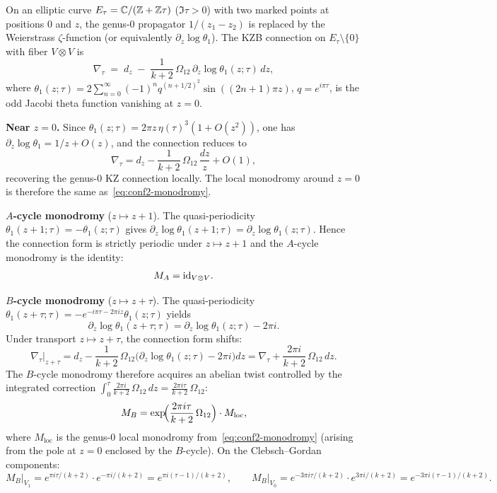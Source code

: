 \begin{computation}
On an elliptic curve $E_\tau=\mathbb C/(\mathbb Z+\mathbb Z\tau)$ ($\Im\tau>0$) with two
marked points at positions $0$ and $z$,
the genus-$0$ propagator $1/(z_1-z_2)$ is replaced by the
Weierstrass $\zeta$-function (or equivalently $\partial_z\log\theta_1$).
The KZB connection on $E_\tau\setminus\{0\}$ with fiber $V\otimes V$ is
\begin{equation}%
 \nabla_\tau \;=\; d_z \;-\; \frac{1}{k+2}\,\Omega_{12}\,
 \partial_z\!\log\theta_1(z;\tau)\,dz,
\end{equation}
where $\theta_1(z;\tau)=2\sum_{n=0}^{\infty}(-1)^n q^{(n+1/2)^2}\sin((2n+1)\pi z)$,
$q=e^{i\pi\tau}$, is the odd Jacobi theta function vanishing at $z=0$.

\medskip\noindent\textbf{Near $z=0$.}\;
Since $\theta_1(z;\tau)=2\pi z\,\eta(\tau)^3(1+O(z^2))$,
one has $\partial_z\log\theta_1=1/z+O(z)$, and the connection reduces to
\[
 \nabla_\tau = d_z - \frac{1}{k+2}\,\Omega_{12}\,\frac{dz}{z}+O(1),
\]
recovering the genus-$0$ KZ connection locally. The local monodromy around
$z=0$ is therefore the same as~\eqref{eq:conf2-monodromy}.

\medskip\noindent\textbf{$A$-cycle monodromy} ($z\mapsto z+1$).\;
The quasi-periodicity $\theta_1(z+1;\tau)=-\theta_1(z;\tau)$ gives
$\partial_z\log\theta_1(z+1;\tau)=\partial_z\log\theta_1(z;\tau)$.
Hence the connection form is strictly periodic under $z\mapsto z+1$
and the $A$-cycle monodromy is the identity:
\begin{equation}%
 M_A = \id_{V\otimes V}.
\end{equation}

\medskip\noindent\textbf{$B$-cycle monodromy} ($z\mapsto z+\tau$).\;
The quasi-periodicity
$\theta_1(z+\tau;\tau)=-e^{-i\pi\tau-2\pi iz}\theta_1(z;\tau)$ yields
\[
 \partial_z\log\theta_1(z+\tau;\tau)
 = \partial_z\log\theta_1(z;\tau)-2\pi i.
\]
Under transport $z\mapsto z+\tau$, the connection form shifts:
\[
 \nabla_\tau\big|_{z+\tau}
 =
 d_z - \frac{1}{k+2}\,\Omega_{12}\bigl(\partial_z\log\theta_1(z;\tau)-2\pi i\bigr)dz
 =
 \nabla_\tau + \frac{2\pi i}{k+2}\,\Omega_{12}\,dz.
\]
The $B$-cycle monodromy therefore acquires an abelian twist
controlled by the integrated correction $\int_0^\tau \frac{2\pi i}{k+2}\,\Omega_{12}\,dz
= \frac{2\pi i\tau}{k+2}\,\Omega_{12}$:
\begin{equation}%
 M_B = \exp\!\Bigl(\frac{2\pi i\tau}{k+2}\,\Omega_{12}\Bigr)
 \cdot M_{\mathrm{loc}},
\end{equation}
where $M_{\mathrm{loc}}$ is the genus-$0$ local monodromy from~\eqref{eq:conf2-monodromy}
(arising from the pole at $z=0$ enclosed by the $B$-cycle).
On the Clebsch--Gordan components:
\[
 M_B\big|_{V_1} = e^{\pi i\tau/(k+2)}\cdot e^{-\pi i/(k+2)}
 = e^{\pi i(\tau-1)/(k+2)},
 \qquad
 M_B\big|_{V_0} = e^{-3\pi i\tau/(k+2)}\cdot e^{3\pi i/(k+2)}
 = e^{-3\pi i(\tau-1)/(k+2)}.
\]


\end{computation}
